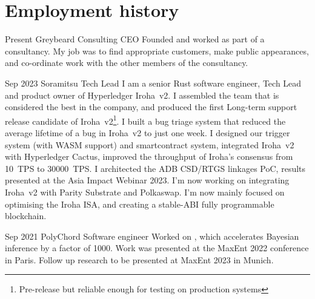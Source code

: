 \documentclass{CurriculumVitae}[10pt, condensed]
\begin{document}
\section*{Employment history} {%
  \setlength{\parindent}{0in}%

  {Present}%
  {Greybeard Consulting}%
  {CEO}%
  {%
    Founded and worked as part of a consultancy.  My job was to find
    appropriate customers, make public appearances, and co-ordinate
    work with the other members of the consultancy.
  }%

%
    {Sep 2023}%
    {Soramitsu}%
    {Tech Lead}%
    {%
      I am a senior Rust software engineer, Tech Lead and product owner
      of Hyperledger Iroha~v2.  I assembled the team that is considered
      the best in the company, and produced the first Long-term support
      release candidate of Iroha~v2\footnote{Pre-release but reliable
      enough for testing on production systems}. I built a bug triage
      system that reduced the average lifetime of a bug in Iroha~v2 to
      just one week. I designed our trigger system (with WASM support)
      and smartcontract system, integrated Iroha~v2 with Hyperledger
      Cactus, improved the throughput of Iroha's consensus from 10~TPS
      to 30000~TPS. I architected the ADB CSD/RTGS linkages PoC, results
      presented at the Asia Impact Webinar 2023.  I'm now working on
      integrating Iroha~v2 with Parity Substrate and Polkaswap.  I'm now
      mainly focused on optimising the Iroha ISA, and creating a
      stable-ABI fully programmable blockchain. }%

%
    {Sep 2021}%
    {PolyChord}%
    {Software engineer}%
    {%
      Worked on , which accelerates Bayesian inference
      by a factor of 1000. Work was presented at the MaxEnt 2022
      conference in Paris. Follow up research to be presented at MaxEnt
      2023 in Munich.
    }%


\begin{comment}
  \job{Jul 2020}{Oct 2020} {Cambridge DAMTP} {QA intern} {Designed a
    neural network for vetting the applicability of the NHSx X-ray
    data for automated diagnosis of COVID-19, which was comparable in
    precision, but required 5--6 times less processing power.  }
\end{comment}

\begin{comment}
  \job{Jul 2018}{Oct 2018} {Cambridge University Computer Lab}
  {Software Development Intern} {Designed, and improved a dynamic road
    network All-pairs shortest path solver, using a highly
    paralleliseable graph traversal framework, which improved
    performance by a factor of 50.  }
\end{comment}

}
\end{document}
